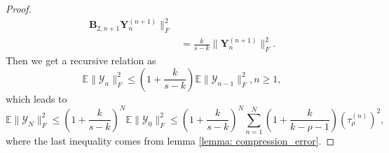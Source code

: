 \begin{lem}
\begin{proof}
\begin{equation}
\begin{aligned}
\mathbf{B}_{2,n+1}\mathbf{Y}_n^{(n+1)}\|_F^2\\
& = \frac{k}{s-k}\|\mathbf{Y}_n^{(n+1)}\|_F^2.
\end{aligned}
\end{equation}
Then we get a recursive relation as 
\begin{equation}
\mathbb{E}\|\mathscr{Y}_{n}\|_F^2 \le  \left(1+\frac{k}{s-k}\right) \mathbb{E}\|\mathscr{Y}_{n-1}\|_F^2, n\ge 1, 
\end{equation}
which leads to 
\begin{equation}
\mathbb{E}\|\mathscr{Y}_{N}\|_F^2 \le  \left(1+\frac{k}{s-k}\right)^N  \mathbb{E}\|\mathscr{Y}_0\|_F^2 \le  \left(1+\frac{k}{s-k}\right)^N  \sum_{n=1}^N \left(1+\frac{k}{k-\rho-1}\right)(\tau^{(n)}_\rho)^2, 
\end{equation}
where the last inequality comes from lemma \ref{lemma: compression_error}. 
\end{proof}
\end{lem}